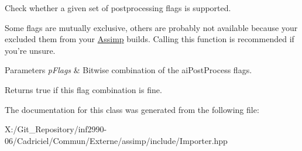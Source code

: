 Check whether a given set of postprocessing flags is supported. 

Some flags are mutually exclusive, others are probably not available because your excluded them from your \hyperlink{namespace_assimp}{Assimp} builds. Calling this function is recommended if you're unsure.


\begin{DoxyParams}{Parameters}
{\em p\-Flags} & Bitwise combination of the ai\-Post\-Process flags. \\
\hline
\end{DoxyParams}
\begin{DoxyReturn}{Returns}
true if this flag combination is fine. 
\end{DoxyReturn}


The documentation for this class was generated from the following file\-:\begin{DoxyCompactItemize}
\item 
X\-:/\-Git\-\_\-\-Repository/inf2990-\/06/\-Cadriciel/\-Commun/\-Externe/assimp/include/Importer.\-hpp\end{DoxyCompactItemize}
